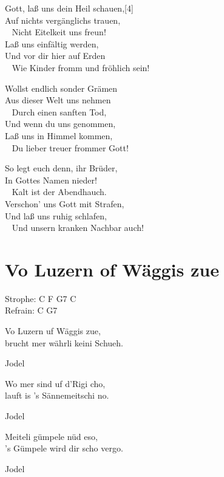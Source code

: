 \documentclass[
  letterpaper,
  twoside=false]{scrbook}
\begin{document}
Gott, laß uns dein Heil schauen,{[}4{]}\\
Auf nichts vergänglichs trauen,\\
\hspace*{0.333em} ~ Nicht Eitelkeit uns freun!\\
Laß uns einfältig werden,\\
Und vor dir hier auf Erden\\
\hspace*{0.333em} ~ Wie Kinder fromm und fröhlich sein!

Wollst endlich sonder Grämen\\
Aus dieser Welt uns nehmen\\
\hspace*{0.333em} ~ Durch einen sanften Tod,\\
Und wenn du uns genommen,\\
Laß uns in Himmel kommen,\\
\hspace*{0.333em} ~ Du lieber treuer frommer Gott!

So legt euch denn, ihr Brüder,\\
In Gottes Namen nieder!\\
\hspace*{0.333em} ~ Kalt ist der Abendhauch.\\
Verschon' uns Gott mit Strafen,\\
Und laß uns ruhig schlafen,\\
\hspace*{0.333em} ~ Und unsern kranken Nachbar auch!

\hypertarget{vo-luzern-of-wuxe4ggis-zue}{%
\chapter{Vo Luzern of Wäggis zue}\label{vo-luzern-of-wuxe4ggis-zue}}

Strophe: C F G7 C\\
Refrain: C G7

Vo Luzern uf Wäggis zue,\\
brucht mer währli keini Schueh.

Jodel

Wo mer sind uf d'Rigi cho,\\
lauft is 's Sännemeitschi no.

Jodel

Meiteli gümpele nüd eso,\\
's Gümpele wird dir scho vergo.

Jodel
\end{document}
